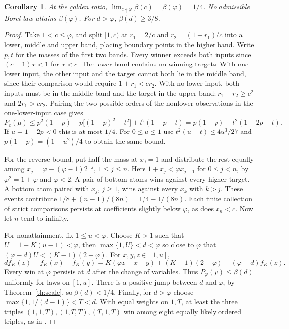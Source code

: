 \documentclass[11pt]{article}
\newtheorem{corollary}[theorem]{Corollary}
\newcommand{\ph}{\varphi}
\begin{document}
\begin{corollary}\label{co:golden}
At the golden ratio, $\displaystyle\lim_{c\uparrow\ph}\beta(c)=\beta(\ph)=1/4$.
No admissible Borel law attains $\beta(\ph)$. For $d>\ph$, $\beta(d)\ge3/8$.
\end{corollary}
\begin{proof}
Take $1<c\le\ph$, and split $[1,c)$ at $r_1=2/c$ and
$r_2=(1+r_1)/c$ into a lower, middle and upper band, placing
boundary points in the higher band. Write $p,t$ for the masses of
the first two bands. Every winner exceeds both inputs since
$(c-1)x<1$ for $x<c$. The lower band contains no winning targets.
With one lower input, the other input and the target cannot both
lie in the middle band, since their comparison would require
$1+r_1<c r_2$. With no lower input, both inputs must be in the
middle band and the target in the upper band: $r_1+r_2\ge c^2$
and $2r_1>c r_2$. Pairing the two possible orders of the nonlower
observations in the one-lower-input case gives
\[
 P_c(\mu)\le p^2(1-p)+p\big[(1-p)^2-t^2\big]+t^2(1-p-t)
          =p(1-p)+t^2(1-2p-t).
\]
If $u=1-2p<0$ this is at most $1/4$. For $0\le u\le 1$ use
$t^2(u-t)\le4u^3/27$ and $p(1-p)=(1-u^2)/4$ to obtain the same bound.

For the reverse bound, put half the mass at $x_0=1$ and distribute
the rest equally among $x_j=\ph-(\ph-1)2^{-j}$, $1\le j\le n$.
Here $1+x_j<\ph x_{j+1}$ for $0\le j<n$, by $\ph^2=1+\ph$
and $\ph<2$. A pair of bottom atoms wins against every higher
target. A bottom atom paired with $x_j$, $j\ge1$, wins against
every $x_k$ with $k>j$. These events contribute
$1/8+(n-1)/(8n)=1/4-1/(8n)$. Each finite collection of strict
comparisons persists at coefficients slightly below $\ph$, as
does $x_n<c$. Now let $n$ tend to infinity.

For nonattainment, fix $1\le u<\ph$. Choose $K>1$ such that
$U=1+K(u-1)<\ph$, then $\max\{1,U\}<d<\ph$ so close to $\ph$
that $(\ph-d)U<(K-1)(2-\ph)$. For $x,y,z\in[1,u]$,
\[
 d f_K(z)-f_K(x)-f_K(y)
 =K(\ph z-x-y)+(K-1)(2-\ph)-(\ph-d)f_K(z).
\]
Every win at $\ph$ persists at $d$ after the change of variables.
Thus $P_{\ph}(\mu)\le\beta(d)$ uniformly for laws on $[1,u]$.
There is a positive jump between $d$ and $\ph$, by
Theorem~\ref{th:scale}, so $\beta(d)<1/4$. Finally, for $d>\ph$
choose $\max\{1,1/(d-1)\}<T<d$. With equal weights on $1,T$, at least the
three triples $(1,1,T),(1,T,T),(T,1,T)$ win among eight equally likely
ordered triples, as in \cite[Corollary~6.2]{zb}.
\end{proof}
\end{document}

